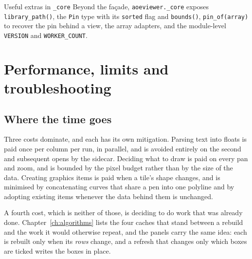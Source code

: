 \documentclass[11pt,a4paper,oneside]{report}
\newcommand{\code}[1]{\texttt{#1}}
\begin{document}
\begin{aoenote}{Useful extras in \code{\_core}}
Beyond the fa\c{c}ade, \code{aoeviewer.\_core} exposes \code{library\_path()},
the \code{Pin} type with its \code{sorted} flag and \code{bounds()},
\code{pin\_of(array)} to recover the pin behind a view, the array adapters, and
the module-level \code{VERSION} and \code{WORKER\_COUNT}.
\end{aoenote}

\chapter{Performance, limits and troubleshooting}
\label{ch:performance}

\section{Where the time goes}

Three costs dominate, and each has its own mitigation. Parsing text into floats
is paid once per column per run, in parallel, and is avoided entirely on the
second and subsequent opens by the sidecar. Deciding what to draw is paid on
every pan and zoom, and is bounded by the pixel budget rather than by the size
of the data. Creating graphics items is paid when a tile's shape changes, and is
minimised by concatenating curves that share a pen into one polyline and by
adopting existing items whenever the data behind them is unchanged.

A fourth cost, which is neither of those, is deciding to do work that was
already done. Chapter~\ref{ch:algorithms} lists the four caches that stand
between a rebuild and the work it would otherwise repeat, and the panels carry
the same idea: each is rebuilt only when its \emph{rows} change, and a
refresh that changes only which boxes are ticked writes the boxes in place.
\end{document}

